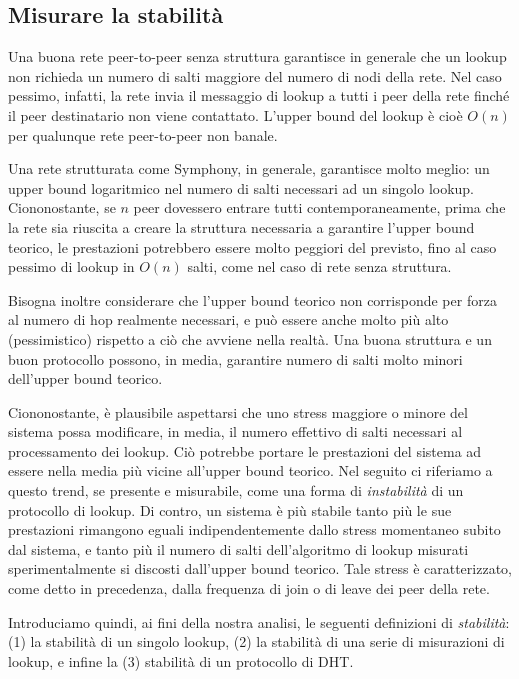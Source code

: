 \documentclass[prodmode,acmtap]{acmlarge}
\begin{document}
\subsection{Misurare la stabilità}

Una buona rete peer-to-peer senza struttura garantisce in generale che un lookup non richieda un numero di salti maggiore del numero di nodi della rete. Nel caso pessimo, infatti, la rete invia il messaggio di lookup a tutti i peer della rete finché il peer destinatario non viene contattato. L'upper bound del lookup è cioè $O(n)$ per qualunque rete peer-to-peer non banale.

Una rete strutturata come Symphony, in generale, garantisce molto meglio: un upper bound logaritmico nel numero di salti necessari ad un singolo lookup.
Ciononostante, se $n$ peer dovessero entrare tutti contemporaneamente, prima che la rete sia riuscita a creare la struttura necessaria a garantire l'upper bound teorico, le prestazioni potrebbero essere molto peggiori del previsto, fino al caso pessimo di lookup in $O(n)$ salti, come nel caso di rete senza struttura.

Bisogna inoltre considerare che l'upper bound teorico non corrisponde per forza al numero di hop realmente necessari, e può essere anche molto più alto (pessimistico) rispetto a ciò che avviene nella realtà. Una buona struttura e un buon protocollo possono, in media, garantire numero di salti molto minori dell'upper bound teorico.

Ciononostante, è plausibile aspettarsi che uno stress maggiore o minore del sistema possa modificare, in media, il numero effettivo di salti necessari al processamento dei lookup. Ciò potrebbe portare le prestazioni del sistema ad essere nella media più vicine all'upper bound teorico. Nel seguito ci riferiamo a questo trend, se presente e misurabile, come una forma di \emph{instabilità} di un protocollo di lookup. Di contro, un sistema è più stabile tanto più le sue prestazioni rimangono eguali indipendentemente dallo stress momentaneo subito dal sistema, e tanto più il numero di salti dell'algoritmo di lookup misurati sperimentalmente si discosti dall'upper bound teorico. Tale stress è caratterizzato, come detto in precedenza, dalla frequenza di join o di leave dei peer della rete.

Introduciamo quindi, ai fini della nostra analisi, le seguenti definizioni di \emph{stabilità}: (1) la stabilità di un singolo lookup, (2) la stabilità di una serie di misurazioni di lookup, e infine la (3) stabilità di un protocollo di DHT.
\end{document}
